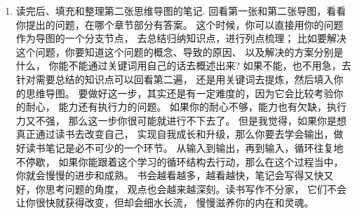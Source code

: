 \documentclass[../main.tex]{subfiles}
\begin{document}
\begin{cuenotes}
{\begin{enumerate}
        潜意识会`引'着你读到重点部分，所以我觉得用什么方法来读书，
        并不重要，重要的是，它对你有用就行。
        就像俗话说的：``别管黑猫白猫，能抓到老鼠的就是好猫''，
        我看书就经常这样，别管别人说什么，只要我看到了，觉得不错，
        我就会去试一下，好用就借鉴，不好用就不用。
      \item 读完后、填充和整理第二张思维导图的笔记.
        回看第一张和第二张导图，看看你提出的问题，在哪个章节部分有答案。
        这个时候，你可以直接用你的问题作为导图的一个分支节点，
        去总结归纳知识点，进行列点梳理；
        比如要解决这个问题，你要知道这个问题的概念、导致的原因、
        以及解决的方案分别是什么，
        你能不能通过关键词用自己的话去概述出来?
        如果不能，也不用急，去针对需要总结的知识点可以回看第二遍，
        还是用关键词去提炼，然后填入你的思维导图。
        要做好这一步，其实还是有一定难度的，因为它会比较考验你的耐心，
        能力还有执行力的问题。
        如果你的耐心不够，能力也有欠缺，执行力又不强，
        那么这一步你很可能就进行不下去了。
        但是我觉得，如果你是想真正通过读书去改变自己，
        实现自我成长和升级，那么你要去学会输出，做好读书笔记是必不可少的一个环节。
        从输入到输出，再到输入，循环往复地不停歇，
        如果你能跟着这个学习的循环结构去行动，那么在这个过程当中，
        你就会慢慢的进步和成熟。
        书会越看越多，越看越快，笔记会写得又快又好，你思考问题的角度，
        观点也会越来越深刻。读书写作不分家，
        它们不会让你很快就获得改变，但却会细水长流，
        慢慢滋养你的内在和灵魂。
    \end{enumerate}
    }
\end{cuenotes}
%
\end{document}
